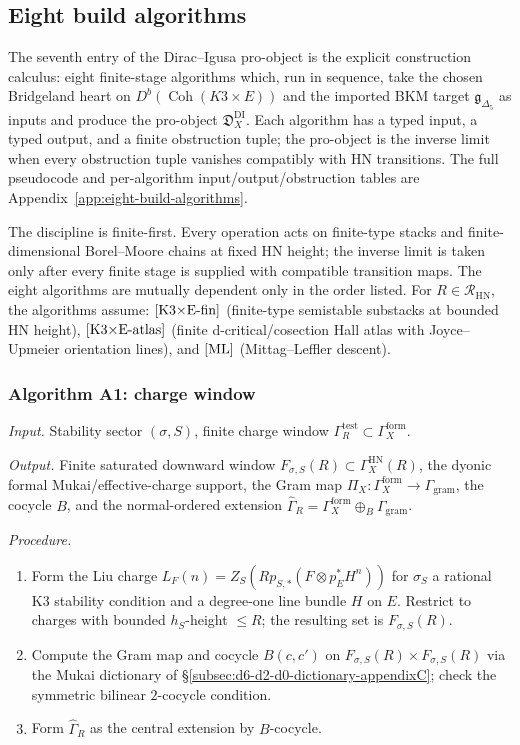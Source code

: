 \subsection{Eight build algorithms}
\label{subsec:eight-build-algorithms}

The seventh entry of the Dirac--Igusa pro-object is the explicit
construction calculus: eight finite-stage algorithms which, run in
sequence, take the chosen Bridgeland heart on
$D^b(\operatorname{Coh}(K3\times E))$ and the imported BKM target
$\mathfrak g_{\Delta_5}$ as inputs and produce the pro-object
$\mathfrak D_X^{\mathrm{DI}}$.  Each algorithm has a typed input,
a typed output, and a finite obstruction tuple; the pro-object is the
inverse limit when every obstruction tuple vanishes compatibly with
HN transitions.  The full pseudocode and per-algorithm
input/output/obstruction tables are
Appendix~\ref{app:eight-build-algorithms}.

The discipline is finite-first.  Every operation acts on
finite-type stacks and finite-dimensional Borel--Moore chains at
fixed HN height; the inverse limit is taken only after every finite
stage is supplied with compatible transition maps.  The eight
algorithms are mutually dependent only in the order listed.  For
$R\in\mathcal R_{\mathrm{HN}}$, the algorithms assume:
$[\textup{K3$\times$E-fin}]$ (finite-type semistable substacks
at bounded HN height),
$[\textup{K3$\times$E-atlas}]$ (finite d-critical/cosection
Hall atlas with Joyce--Upmeier orientation lines), and
$[\textup{ML}]$ (Mittag--Leffler descent).

\subsubsection*{Algorithm A1: charge window}

\textit{Input.} Stability sector $(\sigma,S)$, finite charge window
$\Gamma_R^{\mathrm{test}}\subset\Gamma_X^{\mathrm{form}}$.

\textit{Output.} Finite saturated downward window
$F_{\sigma,S}(R)\subset\Gamma_X^{\mathrm{HN}}(R)$, the dyonic
formal Mukai/effective-charge support, the Gram map
$\Pi_X:\Gamma_X^{\mathrm{form}}\to\Gamma_{\mathrm{gram}}$, the cocycle
$B$, and the normal-ordered extension
$\widehat\Gamma_R=\Gamma_X^{\mathrm{form}}\oplus_B\Gamma_{\mathrm{gram}}$.

\textit{Procedure.}
\begin{enumerate}
\item Form the Liu charge $L_F(n)=Z_S(Rp_{S,*}(F\otimes p_E^*H^n))$
\cite{LiuProductStability} for $\sigma_S$ a rational K3 stability
condition and a degree-one line bundle $H$ on $E$.  Restrict to
charges with bounded $h_S$-height $\le R$; the resulting set is
$F_{\sigma,S}(R)$.
\item Compute the Gram map and cocycle $B(c,c')$ on
$F_{\sigma,S}(R)\times F_{\sigma,S}(R)$ via the Mukai dictionary of
\S\ref{subsec:d6-d2-d0-dictionary-appendixC}; check the symmetric
bilinear $2$-cocycle condition.
\item Form $\widehat\Gamma_R$ as the central extension by
$B$-cocycle.
\end{enumerate}

